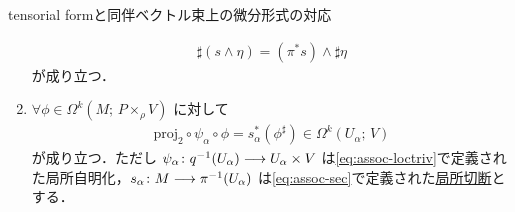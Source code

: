 \documentclass[geometry_main]{subfiles}
\begin{document}
\begin{myprop}[label=prop:assoc-basic]{tensorial formと同伴ベクトル束上の微分形式の対応}
\begin{enumerate}
        \begin{align}
            \sharp (s \wedge \eta) = (\pi^* s)\wedge \sharp \eta
        \end{align}
        が成り立つ．
        \item 
        $\forall \phi \in \Omega^k (M;\, P \times_\rho V)$ に対して
        \begin{align}
            \mathrm{proj}_2 \circ \psi_\alpha \circ \phi = s_\alpha^* (\phi^\sharp) \in \Omega^k (U_\alpha;\, V)
        \end{align}
        が成り立つ．ただし $\psi_\alpha \colon q^{-1} (U_\alpha) \longrightarrow U_\alpha \times V$ は\eqref{eq:assoc-loctriv}で定義された局所自明化，$s_\alpha \colon M \longrightarrow \pi^{-1}(U_\alpha)$ は\eqref{eq:assoc-sec}で定義された\hyperref[def.section]{局所切断}とする．
    \end{enumerate}
\end{myprop}
\end{document}
